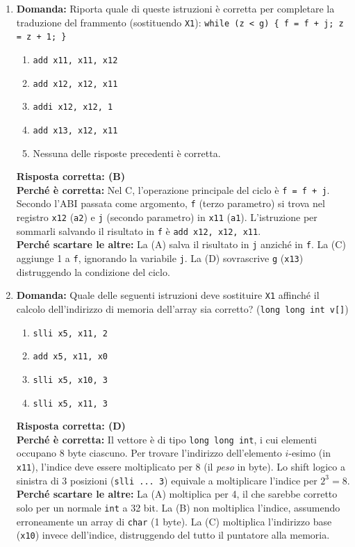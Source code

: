 \documentclass[12pt, a4paper]{article}
\begin{document}
\begin{enumerate}
    \item \textbf{Domanda:} Riporta quale di queste istruzioni è corretta per completare la traduzione del frammento (sostituendo \texttt{X1}): \texttt{while (z < g) \{ f = f + j; z = z + 1; \}}
    \begin{enumerate}[label=(\Alph*)]
        \item \texttt{add x11, x11, x12}
        \item \texttt{add x12, x12, x11}
        \item \texttt{addi x12, x12, 1}
        \item \texttt{add x13, x12, x11}
        \item Nessuna delle risposte precedenti è corretta.
    \end{enumerate}
    \textbf{Risposta corretta: (B)} \\
    \textbf{Perché è corretta:} Nel C, l'operazione principale del ciclo è \texttt{f = f + j}. Secondo l'ABI passata come argomento, \texttt{f} (terzo parametro) si trova nel registro \texttt{x12} (\texttt{a2}) e \texttt{j} (secondo parametro) in \texttt{x11} (\texttt{a1}). L'istruzione per sommarli salvando il risultato in \texttt{f} è \texttt{add x12, x12, x11}. \\
    \textbf{Perché scartare le altre:} La (A) salva il risultato in \texttt{j} anziché in \texttt{f}. La (C) aggiunge 1 a \texttt{f}, ignorando la variabile \texttt{j}. La (D) sovrascrive \texttt{g} (\texttt{x13}) distruggendo la condizione del ciclo.

    \item \textbf{Domanda:} Quale delle seguenti istruzioni deve sostituire \texttt{X1} affinché il calcolo dell'indirizzo di memoria dell'array sia corretto? (\texttt{long long int v[]})
    \begin{enumerate}[label=(\Alph*)]
        \item \texttt{slli x5, x11, 2}
        \item \texttt{add x5, x11, x0}
        \item \texttt{slli x5, x10, 3}
        \item \texttt{slli x5, x11, 3}
    \end{enumerate}
    \textbf{Risposta corretta: (D)} \\
    \textbf{Perché è corretta:} Il vettore è di tipo \texttt{long long int}, i cui elementi occupano 8 byte ciascuno. Per trovare l'indirizzo dell'elemento $i$-esimo (in \texttt{x11}), l'indice deve essere moltiplicato per 8 (il \textit{peso} in byte). Lo shift logico a sinistra di 3 posizioni (\texttt{slli ... 3}) equivale a moltiplicare l'indice per $2^3 = 8$. \\
    \textbf{Perché scartare le altre:} La (A) moltiplica per 4, il che sarebbe corretto solo per un normale \texttt{int} a 32 bit. La (B) non moltiplica l'indice, assumendo erroneamente un array di \texttt{char} (1 byte). La (C) moltiplica l'indirizzo base (\texttt{x10}) invece dell'indice, distruggendo del tutto il puntatore alla memoria.


\end{enumerate}
\end{document}
